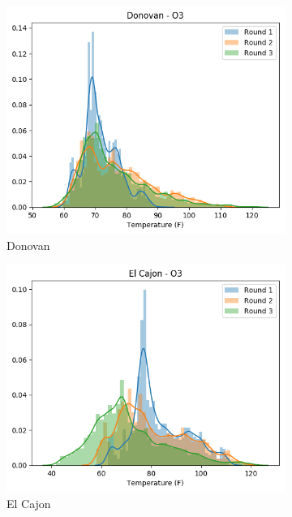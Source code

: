 \documentclass[journal abbreviation, manuscript]{copernicus}
\begin{document}
\begin{figure}[H]
\centering
\begin{subfigure}{0.32\textwidth}
\includegraphics[width=\textwidth]{results/distributions/location_donovan_temperature.png}
\caption{Donovan}
\end{subfigure}
\begin{subfigure}{0.32\textwidth}
\includegraphics[width=\textwidth]{results/distributions/location_elcajon_temperature.png}
\caption{El Cajon}
\end{subfigure}
\begin{subfigure}{0.32\textwidth}

\end{subfigure}
\end{figure}
\end{document}

